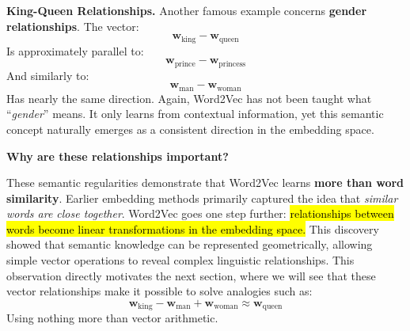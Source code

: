 \highspace
\textcolor{Green3}{ \textbf{King-Queen Relationships.}} Another famous example concerns \textbf{gender relationships}. The vector:
\begin{equation*}
    \mathbf{w}_{\text{king}} - \mathbf{w}_{\text{queen}}
\end{equation*}
Is approximately parallel to:
\begin{equation*}
    \mathbf{w}_{\text{prince}} - \mathbf{w}_{\text{princess}}
\end{equation*}
And similarly to:
\begin{equation*}
    \mathbf{w}_{\text{man}} - \mathbf{w}_{\text{woman}}
\end{equation*}
Has nearly the same direction. Again, Word2Vec has not been taught what ``\emph{gender}'' means. It only learns from contextual information, yet this semantic concept naturally emerges as a consistent direction in the embedding space.

\highspace
\begin{flushleft}
    \textcolor{Green3}{ \textbf{Why are these relationships important?}}
\end{flushleft}
These semantic regularities demonstrate that Word2Vec learns \textbf{more than word similarity}. Earlier embedding methods primarily captured the idea that \emph{similar words are close together}. Word2Vec goes one step further: \hl{relationships between words become linear transformations in the embedding space.} This discovery showed that semantic knowledge can be represented geometrically, allowing simple vector operations to reveal complex linguistic relationships. This observation directly motivates the next section, where we will see that these vector relationships make it possible to solve analogies such as:
\begin{equation*}
    \mathbf{w}_{\text{king}} - \mathbf{w}_{\text{man}} + \mathbf{w}_{\text{woman}} \approx \mathbf{w}_{\text{queen}}
\end{equation*}
Using nothing more than vector arithmetic.